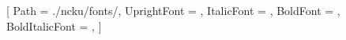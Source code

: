 \newcommand{\SetCustomEngFontFiles}[4]
{%
  \SetFontUseType{\VarFontTypeCustom}
  \renewcommand{\VarFontTypeCustomEngFileNameNormal}{#1}%
  \renewcommand{\VarFontTypeCustomEngFileNameItalic}{#2}%
  \renewcommand{\VarFontTypeCustomEngFileNameBold}{#3}%
  \renewcommand{\VarFontTypeCustomEngFileNameBoldItalic}{#4}%
} %

\newcommand{\SetCustomChiFontFiles}[4]
{%
  \SetFontUseType{\VarFontTypeCustom}
  \renewcommand{\VarFontTypeCustomChiFileNameNormal}{#1}%
  \renewcommand{\VarFontTypeCustomChiFileNameItalic}{#2}%
  \renewcommand{\VarFontTypeCustomChiFileNameBold}{#3}%
  \renewcommand{\VarFontTypeCustomChiFileNameBoldItalic}{#4}%
} %
\newcommand{\VarFontTypeCustom}{10}


\def \VarFontDirPath {./ncku/fonts/} %
\def \GetFontDirPath {\VarFontDirPath}

\newcommand{\VarFontUseType}{\VarFontTypeTimesKaiu} %
\newcommand{\GetFontUseType}{\VarFontUseType}
\newcommand{\SetFontUseType}[1]
{%
  \renewcommand{\VarFontUseType}{#1}%
} %


\newcommand{\SetEngFont}[5]
{%
  \setmainfont{#1}[
    Path = \GetFontDirPath,
    UprightFont = #2,
    ItalicFont = #3,
    BoldFont = #4,
    BoldItalicFont = #5
  ]%
} %

\newcommand{\SetChiFont}[5]
{%
  \setCJKmainfont[
    Path = \GetFontDirPath,
    UprightFont = #2,
    ItalicFont = #3,
    BoldFont = #4,
    BoldItalicFont = #5
  ]{#1}%
} %

\newfontfamily{}[
    Path = \GetFontDirPath,
    UprightFont = \VarFontTypeTimesKaiuEngFileNameNormal,
    ItalicFont = \VarFontTypeTimesKaiuEngFileNameItalic,
    BoldFont = \VarFontTypeTimesKaiuEngFileNameBold,
    BoldItalicFont = \VarFontTypeTimesKaiuEngFileNameBoldItalic,
  ]%



